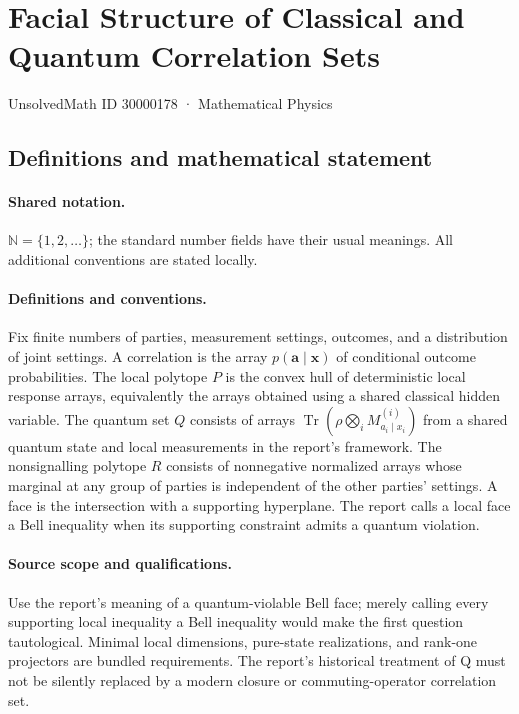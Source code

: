 \documentclass[11pt]{article}
\begin{document}
\setcounter{section}{30000177}
\section{Facial Structure of Classical and Quantum Correlation Sets}\label{30000178}
{\small UnsolvedMath ID 30000178 · Mathematical Physics}
\subsection{Definitions and mathematical statement}

\paragraph{Shared notation.}$\mathbb N=\{1,2,\ldots\}$; the standard number fields have their usual meanings. All additional conventions are stated locally.


\paragraph{Definitions and conventions.} Fix finite numbers of parties, measurement settings, outcomes, and a distribution of joint settings. A correlation is the array $p(\mathbf a\mid\mathbf x)$ of conditional outcome probabilities. The local polytope $P$ is the convex hull of deterministic local response arrays, equivalently the arrays obtained using a shared classical hidden variable. The quantum set $Q$ consists of arrays $\operatorname{Tr}(\rho\bigotimes_i M^{(i)}_{a_i\mid x_i})$ from a shared quantum state and local measurements in the report's framework. The nonsignalling polytope $R$ consists of nonnegative normalized arrays whose marginal at any group of parties is independent of the other parties' settings. A face is the intersection with a supporting hyperplane. The report calls a local face a Bell inequality when its supporting constraint admits a quantum violation.

\paragraph{Source scope and qualifications.} Use the report's meaning of a quantum-violable Bell face; merely calling every supporting local inequality a Bell inequality would make the first question tautological. Minimal local dimensions, pure-state realizations, and rank-one projectors are bundled requirements. The report's historical treatment of Q must not be silently replaced by a modern closure or commuting-operator correlation set.
\end{document}

